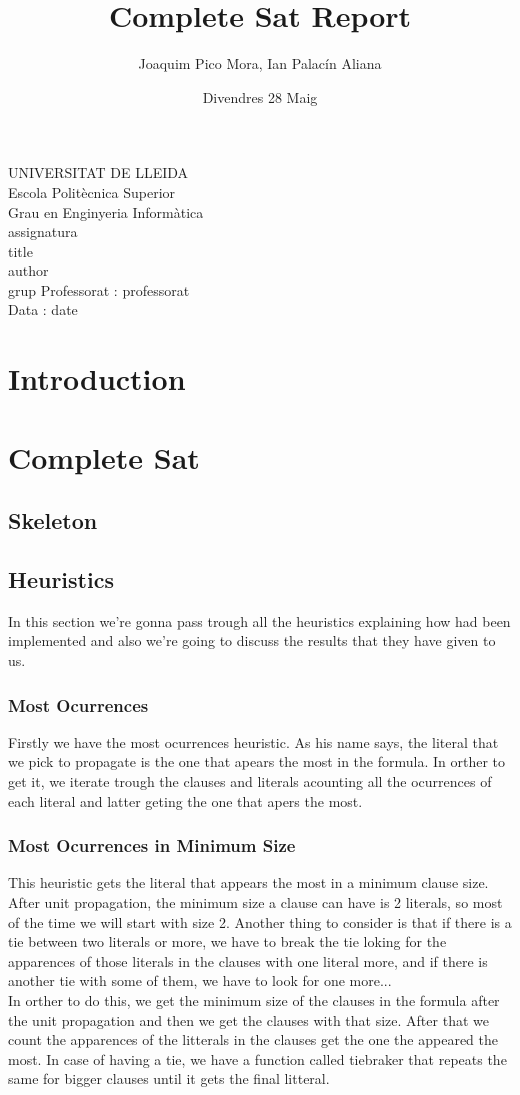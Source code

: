 \documentclass{article}
\title{Complete Sat Report}
\author{Joaquim Pico Mora, Ian Palacín Aliana}
\date{Divendres 28 Maig}
\renewcommand{\maketitle}{ %
	\begin{titlepage}
		\raggedright{UNIVERSITAT DE LLEIDA \\
			Escola Politècnica Superior \\
			Grau en Enginyeria Informàtica\\
			\1assignatura\\}
		\vspace{5cm}
		\centering\huge{\5title \\}
		\vspace{3cm}
		\large{\6author} \\
		\normalsize{\3grup}
		\vfill
		Professorat : \4professorat \\
		Data : \7date
\end{titlepage}}
\begin{document}
	\maketitle
	\thispagestyle{empty}


\section{Introduction}
\section{Complete Sat}
%
\subsection{Skeleton}
%
\subsection{Heuristics}
In this section we're gonna pass trough all the heuristics explaining how had been implemented and also we're going to discuss the results that they have given to us. 
\subsubsection{Most Ocurrences}
Firstly we have the most ocurrences heuristic. As his name says, the literal that we pick to propagate is the one that apears the most in the formula. In orther to get it, we iterate trough the clauses and literals acounting all the ocurrences of each literal and latter geting the one that apers the most.
\subsubsection{Most Ocurrences in Minimum Size}
This heuristic gets the literal that appears the most in a minimum clause size. After unit propagation, the minimum size a clause can have is 2 literals, so most of the time we will start with size 2. Another thing to consider is that if there is a tie between two literals or more, we have to break the tie loking for the apparences of those literals in the clauses with one literal more, and if there is another tie with some of them, we have to look for one more...\\
In orther to do this, we get the minimum size of the clauses in the formula after the unit propagation and then we get the clauses with that size. After that we count the apparences of the litterals in the clauses get the one the appeared the most. In case of having a tie, we have a function called tiebraker that repeats the same for bigger clauses until it gets the final litteral.
\end{document}
